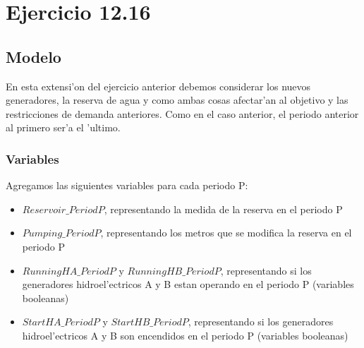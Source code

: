\section{Ejercicio 12.16}
\subsection{Modelo}
En esta extensi'on del ejercicio anterior debemos considerar los nuevos generadores, la reserva de agua y como ambas cosas afectar'an al objetivo y las restricciones de demanda anteriores. Como en el caso anterior, el periodo anterior al primero ser'a el 'ultimo.
\subsubsection{Variables}
Agregamos las siguientes variables para cada periodo P:
\begin{itemize}
\item $Reservoir\_PeriodP$, representando la medida de la reserva en el periodo P
\item $Pumping\_PeriodP$, representando los metros que se modifica la reserva en el periodo P
\item $RunningHA\_PeriodP$ y $RunningHB\_PeriodP$, representando si los generadores hidroel'ectricos A y B estan operando en el periodo P (variables booleanas)
\item $StartHA\_PeriodP$ y $StartHB\_PeriodP$, representando si los generadores hidroel'ectricos A y B son encendidos en el periodo P (variables booleanas)
\end{itemize}

